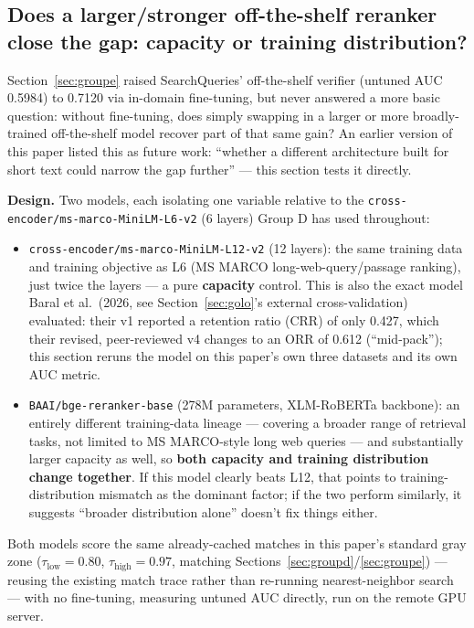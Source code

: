 \documentclass[11pt]{article}
\newcommand{\taulow}{\ensuremath{\tau_{\text{low}}}}
\newcommand{\tauhigh}{\ensuremath{\tau_{\text{high}}}}
\begin{document}
\subsection{Does a larger/stronger off-the-shelf reranker close the gap: capacity or training distribution?}
\label{sec:reranker}

Section~\ref{sec:groupe} raised SearchQueries' off-the-shelf verifier (untuned AUC 0.5984) to 0.7120 via in-domain fine-tuning, but never answered a more basic question: without fine-tuning, does simply swapping in a larger or more broadly-trained off-the-shelf model recover part of that same gain? An earlier version of this paper listed this as future work: ``whether a different architecture built for short text could narrow the gap further'' --- this section tests it directly.

\textbf{Design.} Two models, each isolating one variable relative to the \texttt{cross-encoder/\allowbreak{}ms-marco-Mini\allowbreak{}LM-L6-v2} (6 layers) Group D has used throughout:

\begin{itemize}[nosep]
  \item \texttt{cross-encoder/\allowbreak{}ms-marco-Mini\allowbreak{}LM-L12-v2} (12 layers): the same training data and training objective as L6 (MS MARCO long-web-query/passage ranking), just twice the layers --- a pure \textbf{capacity} control. This is also the exact model Baral et al.\ (2026, see Section~\ref{sec:golo}'s external cross-validation) evaluated: their v1 reported a retention ratio (CRR) of only 0.427, which their revised, peer-reviewed v4 changes to an ORR of 0.612 (``mid-pack''); this section reruns the model on this paper's own three datasets and its own AUC metric.
  \item \texttt{BAAI/\allowbreak{}bge-reranker-base} (278M parameters, XLM-RoBERTa backbone): an entirely different training-data lineage --- covering a broader range of retrieval tasks, not limited to MS MARCO-style long web queries --- and substantially larger capacity as well, so \textbf{both capacity and training distribution change together}. If this model clearly beats L12, that points to training-distribution mismatch as the dominant factor; if the two perform similarly, it suggests ``broader distribution alone'' doesn't fix things either.
\end{itemize}

Both models score the same already-cached matches in this paper's standard gray zone ($\taulow=0.80$, $\tauhigh=0.97$, matching Sections~\ref{sec:groupd}/\ref{sec:groupe}) --- reusing the existing match trace rather than re-running nearest-neighbor search --- with no fine-tuning, measuring untuned AUC directly, run on the remote GPU server.
\end{document}
